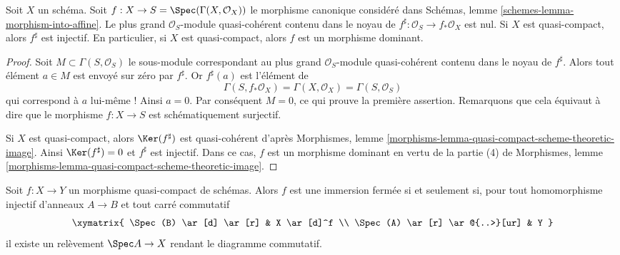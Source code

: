 \begin{lemma}
\label{lemma-aff-is-injective-on-sheaves}
Soit $X$ un schéma. Soit $f : X \to S = \Spec(\Gamma(X, \mathcal{O}_X))$
le morphisme canonique considéré dans
Schémas, lemme \ref{schemes-lemma-morphism-into-affine}.
Le plus grand $\mathcal{O}_S$-module quasi-cohérent contenu
dans le noyau de $f^\sharp : \mathcal{O}_S \to f_*\mathcal{O}_X$
est nul. Si $X$ est quasi-compact, alors $f^\sharp$ est injectif.
En particulier, si $X$ est quasi-compact, alors $f$ est un
morphisme dominant.
\end{lemma}

\begin{proof}
Soit $M \subset \Gamma(S, \mathcal{O}_S)$ le sous-module correspondant
au plus grand $\mathcal{O}_S$-module quasi-cohérent contenu
dans le noyau de $f^\sharp$. Alors tout élément $a \in M$ est envoyé
sur zéro par $f^\sharp$. Or $f^\sharp(a)$ est l'élément de
$$
\Gamma(S, f_*\mathcal{O}_X) = \Gamma(X, \mathcal{O}_X) =
\Gamma(S, \mathcal{O}_S)
$$
qui correspond à $a$ lui-même ! Ainsi $a = 0$. Par conséquent $M = 0$, ce qui prouve
la première assertion. Remarquons que cela équivaut à dire que le morphisme
$f : X \to S$ est schématiquement surjectif.

\medskip\noindent
Si $X$ est quasi-compact, alors $\Ker(f^\sharp)$ est quasi-cohérent d'après
Morphismes, lemme \ref{morphisms-lemma-quasi-compact-scheme-theoretic-image}.
Ainsi $\Ker(f^\sharp) = 0$ et $f^\sharp$ est injectif.
Dans ce cas, $f$ est un morphisme dominant en vertu de la partie (4) de
Morphismes, lemme \ref{morphisms-lemma-quasi-compact-scheme-theoretic-image}.
\end{proof}

\begin{lemma}
\label{lemma-extensive-criterion}
Soit $f: X \to Y$ un morphisme quasi-compact de schémas.
Alors $f$ est une immersion fermée si et seulement si, pour tout homomorphisme
injectif d'anneaux $A \to B$ et tout carré commutatif
$$
\xymatrix{
\Spec(B) \ar[d] \ar[r] & X \ar[d]^f \\
\Spec(A) \ar[r] \ar@{..>}[ur] & Y
}
$$
il existe un relèvement $\Spec A \to X$ rendant le diagramme commutatif.
\end{lemma}

